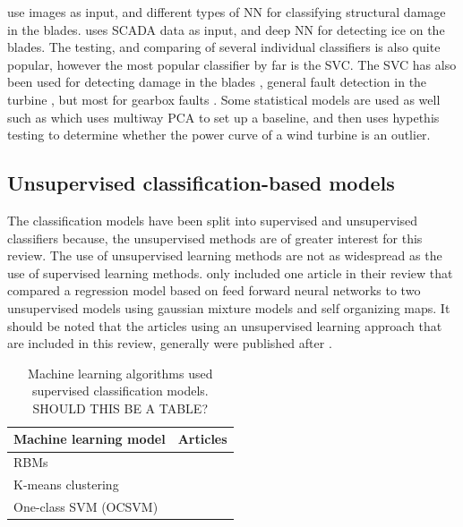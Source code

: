 \textcite{image_based_surface_damage_detection_DL_drone_inspection, image_based_YOLO_YSODA, AI_image_analytics_2_classify_blade_defects, blade_defect_detection_imaging_array} use images as input, and different types of NN for classifying structural damage in the blades. \textcite{deep_learning_for_imbalanced_class_detection_bearing_cm} uses SCADA data as input, and deep NN for detecting ice on the blades. The testing, and comparing of several individual classifiers is also quite popular, however the most popular classifier by far is the SVC. The SVC has also been used for detecting damage in the blades \cite{blade_damage_detection_sup_ml_alg}, general fault detection in the turbine \cite{fault_classification_using_CSO_SVM}, but most for gearbox faults \cite{VMD_MPE_COVAL_fault_detection_gearbox,vibration_acustic_decision_tree_SVM_gearbox, integrated_cm_bearing_fault_wt_gearbox, roller_bearings_cm_fisher_score_and_permutation_entropy}. Some statistical models are used as well such as \textcite{multiway_PCA_multivar_inference_cm_wt} which uses multiway PCA to set up a baseline, and then uses hypethis testing to determine whether the power curve of a wind turbine is an outlier.

\newpage
\subsection{Unsupervised classification-based models}
The classification models have been split into supervised and unsupervised classifiers because, the unsupervised methods are of greater interest for this review. The use of unsupervised learning methods are not as widespread as the use of supervised learning methods. \textcite{ml_for_wt_cond_monit_rev} only included one article in their review that compared a regression model based on feed forward neural networks to two unsupervised models using gaussian mixture models and self organizing maps. It should be noted that the articles using an unsupervised learning approach that are included in this review, generally were published after \cite{ml_for_wt_cond_monit_rev}.

\begin{table}[h]
    \centering
    \begin{tabular}{p{}p{}}
        \toprule
        Machine learning model & Articles \\
        \midrule
        RBMs                    & \cite{unsup_graphical_modeling_wt_cm} \\
        K-means clustering      & \cite{fault_detect_PARAFAC_k_means} \\
        One-class SVM (OCSVM)   & \cite{unsupervised_AD_blade_damage_deep_features_images} \\
        \bottomrule
    \end{tabular}
    \caption{Machine learning algorithms used supervised classification models. SHOULD THIS BE A TABLE?}
    \label{tab:sup_classification_ml_models}
\end{table}

